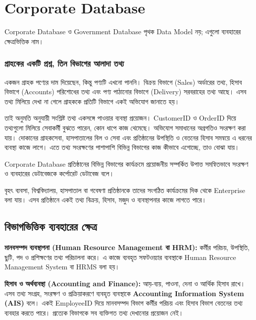 \section{Corporate Database}

Corporate Database ও Government Database পৃথক Data Model নয়; এগুলো ব্যবহারের ক্ষেত্রভিত্তিক নাম।
\label{sec:ch06-corporate-database}

\subsubsection{গ্রাহকের একটি প্রশ্ন, তিন বিভাগের আলাদা তথ্য}
একজন গ্রাহক পণ্যের দাম দিয়েছেন, কিন্তু পণ্যটি এখনো পাননি। বিক্রয় বিভাগে (Sales) অর্ডারের তথ্য, হিসাব বিভাগে (Accounts) পরিশোধের তথ্য এবং পণ্য পাঠানোর বিভাগে (Delivery) সরবরাহের তথ্য আছে। এসব তথ্য মিলিয়ে দেখা না গেলে গ্রাহককে প্রতিটি বিভাগে একই অভিযোগ জানাতে হয়।

তাই অনুমতি অনুযায়ী সংশ্লিষ্ট তথ্য একসঙ্গে পাওয়ার ব্যবস্থা প্রয়োজন। CustomerID ও OrderID দিয়ে তথ্যগুলো মিলিয়ে সেবাকর্মী বুঝতে পারেন, কোন ধাপে কাজ থেমেছে। অভিযোগ সমাধানের অগ্রগতিও সংরক্ষণ করা যায়। দোকানের গ্রাহকসেবা, হাসপাতালের বিল ও সেবা এবং প্রতিষ্ঠানের উপস্থিতি ও বেতনের হিসাব সমন্বয়ে এ ধরনের ব্যবস্থা কাজে লাগে। এতে তথ্য সংরক্ষণের পাশাপাশি বিভিন্ন বিভাগের কাজ কীভাবে এগোচ্ছে, তাও বোঝা যায়।

\begin{definitionbox}{Corporate Database}
প্রতিষ্ঠানের বিভিন্ন বিভাগের কার্যক্রমে প্রয়োজনীয় সম্পর্কিত উপাত্ত সমন্বিতভাবে সংরক্ষণ ও ব্যবহারের ডেটাবেজকে কর্পোরেট ডেটাবেজ বলে।
\end{definitionbox}
বৃহৎ ব্যবসা, বিশ্ববিদ্যালয়, হাসপাতাল বা গবেষণা প্রতিষ্ঠানকে তাদের সংগঠিত কার্যক্রমের দিক থেকে Enterprise বলা যায়। এসব প্রতিষ্ঠানে একই তথ্য বিক্রয়, হিসাব, মজুদ ও ব্যবস্থাপনার কাজে লাগতে পারে।

\subsection{বিভাগভিত্তিক ব্যবহারের ক্ষেত্র}
\textbf{মানবসম্পদ ব্যবস্থাপনা (Human Resource Management বা HRM):} কর্মীর পরিচয়, উপস্থিতি, ছুটি, পদ ও প্রশিক্ষণের তথ্য পরিচালনা করে। এ কাজে ব্যবহৃত সফটওয়্যার ব্যবস্থাকে Human Resource Management System বা HRMS বলা হয়।

\textbf{হিসাব ও অর্থব্যবস্থা (Accounting and Finance):} আয়-ব্যয়, পাওনা, দেনা ও আর্থিক হিসাব রাখে। এসব তথ্য সংগ্রহ, সংরক্ষণ ও প্রক্রিয়াকরণে ব্যবহৃত ব্যবস্থাকে \textbf{Accounting Information System (AIS)} বলে। একই EmployeeID দিয়ে মানবসম্পদ বিভাগ কর্মীর পরিচয় এবং হিসাব বিভাগ বেতনের তথ্য ব্যবহার করতে পারে। প্রত্যেক বিভাগকে সব ব্যক্তিগত তথ্য দেখানোর প্রয়োজন নেই।


